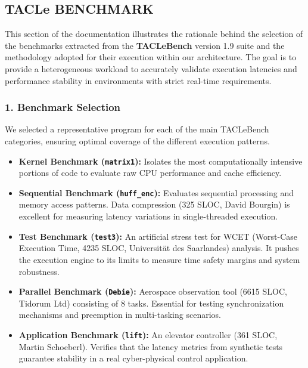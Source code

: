 \subsection{TACLe BENCHMARK}\label{tacle-benchmark-3}

This section of the documentation illustrates the rationale behind the
selection of the benchmarks extracted from the \textbf{TACLeBench}
version 1.9 suite and the methodology adopted for their execution within
our architecture. The goal is to provide a heterogeneous workload to
accurately validate execution latencies and performance stability in
environments with strict real-time requirements.

\subsubsection{1. Benchmark Selection}\label{benchmark-selection-1}

We selected a representative program for each of the main TACLeBench
categories, ensuring optimal coverage of the different execution
patterns.

\begin{itemize}
\item
  \textbf{Kernel Benchmark (\texttt{matrix1}):} Isolates the most
  computationally intensive portions of code to evaluate raw CPU
  performance and cache efficiency.
\item
  \textbf{Sequential Benchmark (\texttt{huff\_enc}):} Evaluates
  sequential processing and memory access patterns. Data compression
  (325 SLOC, David Bourgin) is excellent for measuring latency
  variations in single-threaded execution.
\item
  \textbf{Test Benchmark (\texttt{test3}):} An artificial stress test
  for WCET (Worst-Case Execution Time, 4235 SLOC, Universität des
  Saarlandes) analysis. It pushes the execution engine to its limits to
  measure time safety margins and system robustness.
\item
  \textbf{Parallel Benchmark (\texttt{Debie}):} Aerospace observation
  tool (6615 SLOC, Tidorum Ltd) consisting of 8 tasks. Essential for
  testing synchronization mechanisms and preemption in multi-tasking
  scenarios.
\item
  \textbf{Application Benchmark (\texttt{lift}):} An elevator controller
  (361 SLOC, Martin Schoeberl). Verifies that the latency metrics from
  synthetic tests guarantee stability in a real cyber-physical control
  application.
\end{itemize}

